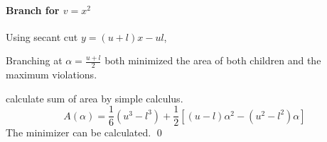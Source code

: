\documentclass[../main]{subfiles}
\begin{document}
\paragraph{Branch for \(v= x^2\)}

Using secant cut \(y = (u + l)x - ul\),

\begin{prop}
  Branching at \(\alpha = \frac{u + l}{2}\) both minimized the area of both children and the maximum violations.
\end{prop}
\begin{pf}
  calculate sum of area by simple calculus.
  \begin{equation}
    A(\alpha) = \frac{1}{6}(u^3- l^3) + \frac{1}{2}\left[(u-l)\alpha^2 - (u^2-l^2)\alpha\right]
  \end{equation}
  The minimizer can be calculated. \hfill\qed
\end{pf}
\end{document}
